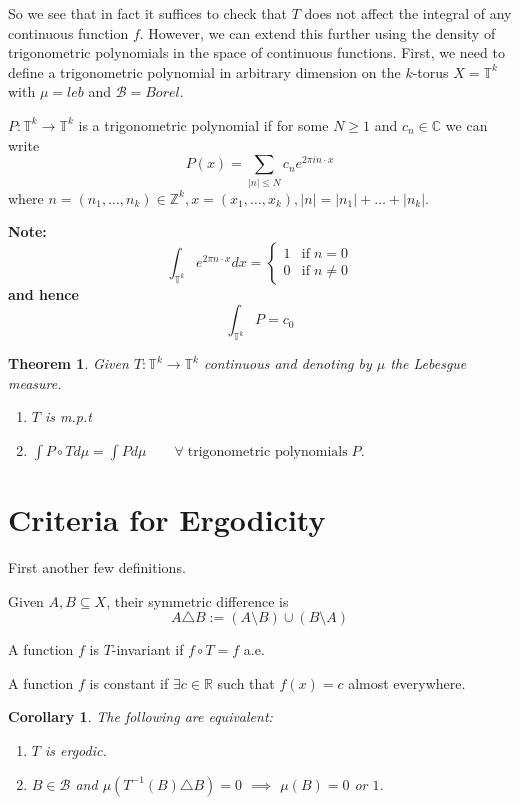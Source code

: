 \documentclass[11pt]{article}
\newcommand{\defeq}{:=}
\newcommand{\abs}[1]{\left|#1\right|}
\newcommand{\symd}{\triangle}
\newcommand{\ktor}{\mathbb{T}^k}
\newcommand{\R}{\mathbb{R}}
\newcommand{\C}{\mathbb{C}}
\newcommand{\Z}{\mathbb{Z}}
\newenvironment{defin}
	{\begin{mdframed}[backgroundcolor=white, roundcorner=5pt, linewidth=1pt, linecolor=RoyalBlue]}
	{\end{mdframed}}
\newcommand{\mdf}[1]{{\color{RoyalBlue} #1}}
\newenvironment{note}
	{\begin{mdframed}[backgroundcolor=white, linecolor=RubineRed, roundcorner=5pt, linewidth=1pt]\bfseries{Note:}\normalfont}
	{\end{mdframed}}
\newtheorem{theorem}[prop]{Theorem}
\newtheorem{cor}[prop]{Corollary}
\begin{document}
So we see that in fact it suffices to check that $T$ does not affect the integral of any continuous function $f$.
However, we can extend this further using the density of trigonometric polynomials in the space of continuous functions. 
First, we need to define a trigonometric polynomial in arbitrary dimension on the $k$-torus $X=\ktor$ with $\mu=leb$ and $\mathcal{B}=Borel$.
\begin{defin}
	$P:\ktor\to\ktor$ is a \mdf{trigonometric polynomial} if for some $N\geq 1$ and $c_n\in\C$ we can write
	$$P(x)=\sum_{\abs{n}\leq N} c_n e^{2\pi in\cdot x}$$
	where $n=(n_1,\dots,n_k)\in\Z^k, x=(x_1,\dots,x_k), \abs{n}=\abs{n_1}+\dots+\abs{n_k}$.
\end{defin}
\begin{note}
	\[
		\int_{\ktor} e^{2\pi n\cdot x} dx =
		\begin{cases}
			1 & \text{if} \; n=0\\
			0 & \text{if} \; n\neq 0
		\end{cases}
	\]
	and hence
	$$\int_{\ktor}P = c_0$$
\end{note}

\begin{theorem}
Given $T:\ktor\to \ktor$ continuous and denoting by $\mu$ the Lebesgue measure.
\begin{enumerate}
	\item $T$ is m.p.t
	\item $\int P\circ T d\mu = \int P d\mu \quad\quad \forall\; \text{trigonometric polynomials}\; P$. 
\end{enumerate}
\end{theorem}

\section{Criteria for Ergodicity}
First another few definitions.
\begin{defin}
Given $A,B\subseteq X$, their \mdf{symmetric difference} is
$$A\symd B\defeq (A \setminus B)\cup (B \setminus A)$$

A function $f$ is \mdf{$T$-invariant} if $f \circ T = f$ a.e.

A function $f$ is \mdf{constant} if $\exists c\in\R$ such that $f(x) = c$ almost everywhere.
\end{defin}

\begin{cor}
The following are equivalent:
\begin{enumerate}
	\item $T$ is ergodic.
	\item $B\in \mathcal{B}$ and $\mu(T^{-1}(B) \symd B) = 0$ $\implies$ $\mu(B) = 0 $ or $1$.
\end{enumerate}
\end{cor}
\end{document}
